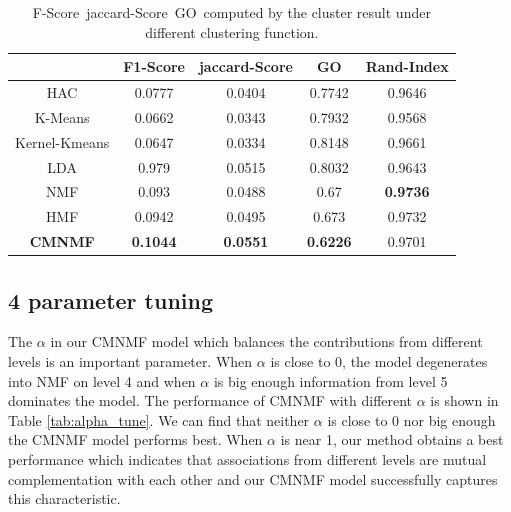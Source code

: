 \documentclass{bmcart}
\begin{document}
\begin{table}
\centering
\caption{F-Score\ jaccard-Score\ GO\ computed by the cluster result under different clustering function.}
\label{tab:go}
\begin{tabular}{|c||c|c|c|c|}
\hline
&F1-Score &jaccard-Score& GO&Rand-Index\\
\hline
\hline
HAC&0.0777&0.0404&0.7742&0.9646\\
\hline
K-Means&0.0662  & 0.0343& 0.7932&0.9568\\
\hline
Kernel-Kmeans&0.0647&0.0334&0.8148&0.9661\\
\hline
LDA&0.979&0.0515&0.8032&0.9643\\
\hline
NMF&0.093&0.0488&0.67&\textbf{0.9736}\\
\hline
HMF&0.0942&0.0495&0.673&0.9732\\
\hline
\hline
\textbf{CMNMF}&\textbf{0.1044}& \textbf{0.0551}& \textbf{0.6226}&0.9701\\
\hline
\end{tabular}
\end{table}

\subsection*{4 parameter tuning}
The $\alpha$ in our CMNMF model which balances the contributions from different levels is an important parameter. When $\alpha$ is close to 0, the model degenerates into NMF on level 4 and when $\alpha$ is big enough information from level 5 dominates the model. The performance of CMNMF with different $\alpha$ is shown in Table \ref{tab:alpha_tune}. We can find that neither $\alpha$ is close to 0 nor big enough the CMNMF model performs best. When $\alpha$ is near 1, our method obtains a best performance which indicates that associations from different levels are mutual complementation with each other and our CMNMF model successfully captures this characteristic.
\end{document}
